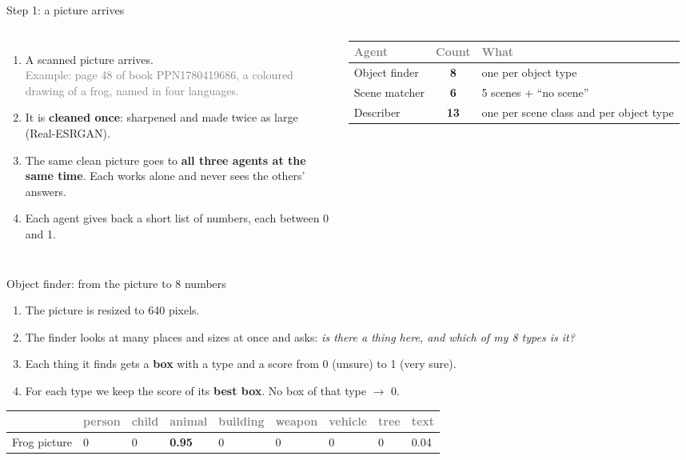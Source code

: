 \documentclass[aspectratio=169,11pt]{beamer}
\newcommand{\h}[1]{\textcolor{grey}{#1}}
\newcommand{\remark}[1]{\par\vspace{0.35cm}{\small\textcolor{grey}{#1}}}
\begin{document}
\begin{frame}{Step 1: a picture arrives}
\begin{columns}[T]
\begin{enumerate}\setlength\itemsep{8pt}
  \item A scanned picture arrives.\\ \textcolor{grey}{Example: page 48 of book PPN1780419686, a coloured drawing of a frog, named in four languages.}
  \item It is \textbf{cleaned once}: sharpened and made twice as large (Real-ESRGAN).
  \item The same clean picture goes to \textbf{all three agents at the same time}. Each works alone and never sees the others' answers.
  \item Each agent gives back a short list of numbers, each between 0 and 1.
\end{enumerate}
\footnotesize
\begin{tabular}{@{}l c L{2.1cm}@{}}
\toprule
\h{Agent} & \h{Count} & \h{What}\\
\midrule
Object finder & \textbf{8} & one per object type\\
Scene matcher & \textbf{6} & 5 scenes + ``no scene''\\
Describer & \textbf{13} & one per scene class and per object type\\
\bottomrule
\end{tabular}
\end{columns}
\remark{The 8 object types: person, child, animal, building, weapon, vehicle, tree, text. The 5 scenes: teaching, family, playing, landscape, drawing.}
\end{frame}

\begin{frame}{Object finder: from the picture to 8 numbers}
\begin{enumerate}\setlength\itemsep{5pt}
  \item The picture is resized to 640 pixels.
  \item The finder looks at many places and sizes at once and asks: \emph{is there a thing here, and which of my 8 types is it?}
  \item Each thing it finds gets a \textbf{box} with a type and a score from 0 (unsure) to 1 (very sure).
  \item For each type we keep the score of its \textbf{best box}. No box of that type $\to$ 0.
\end{enumerate}
\vspace{0.3cm}
\footnotesize
\begin{tabular}{@{}l *{8}{C{1.1cm}}@{}}
\toprule
 & \h{person} & \h{child} & \h{animal} & \h{building} & \h{weapon} & \h{vehicle} & \h{tree} & \h{text}\\
\midrule
Frog picture & 0 & 0 & \textbf{0.95} & 0 & 0 & 0 & 0 & 0.04\\
\bottomrule
\end{tabular}
\remark{One clear box around the frog (animal 0.95) and a faint hint of text (0.04). Nothing else was found.}
\end{frame}
\end{document}
